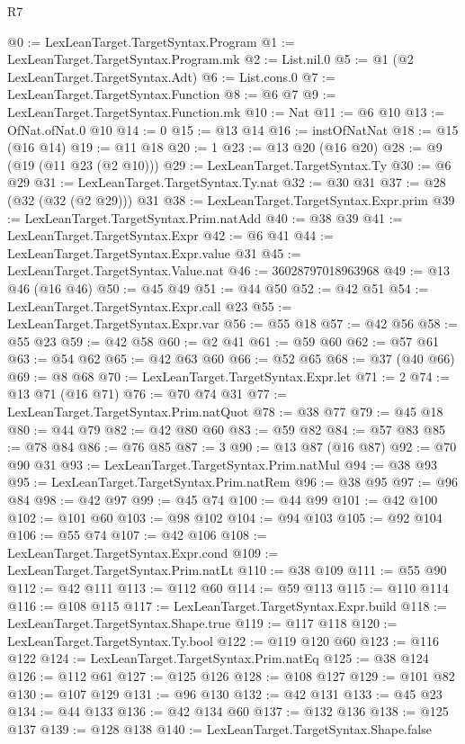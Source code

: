 \begin{lexlean}{R7}
\begin{coremodule}
@0 := LexLeanTarget.TargetSyntax.Program
@1 := LexLeanTarget.TargetSyntax.Program.mk
@2 := List.nil.{0}
@5 := @1 (@2 LexLeanTarget.TargetSyntax.Adt)
@6 := List.cons.{0}
@7 := LexLeanTarget.TargetSyntax.Function
@8 := @6 @7
@9 := LexLeanTarget.TargetSyntax.Function.mk
@10 := Nat
@11 := @6 @10
@13 := OfNat.ofNat.{0} @10
@14 := 0
@15 := @13 @14
@16 := instOfNatNat
@18 := @15 (@16 @14)
@19 := @11 @18
@20 := 1
@23 := @13 @20 (@16 @20)
@28 := @9 (@19 (@11 @23 (@2 @10)))
@29 := LexLeanTarget.TargetSyntax.Ty
@30 := @6 @29
@31 := LexLeanTarget.TargetSyntax.Ty.nat
@32 := @30 @31
@37 := @28 (@32 (@32 (@2 @29))) @31
@38 := LexLeanTarget.TargetSyntax.Expr.prim
@39 := LexLeanTarget.TargetSyntax.Prim.natAdd
@40 := @38 @39
@41 := LexLeanTarget.TargetSyntax.Expr
@42 := @6 @41
@44 := LexLeanTarget.TargetSyntax.Expr.value @31
@45 := LexLeanTarget.TargetSyntax.Value.nat
@46 := 36028797018963968
@49 := @13 @46 (@16 @46)
@50 := @45 @49
@51 := @44 @50
@52 := @42 @51
@54 := LexLeanTarget.TargetSyntax.Expr.call @23
@55 := LexLeanTarget.TargetSyntax.Expr.var
@56 := @55 @18
@57 := @42 @56
@58 := @55 @23
@59 := @42 @58
@60 := @2 @41
@61 := @59 @60
@62 := @57 @61
@63 := @54 @62
@65 := @42 @63 @60
@66 := @52 @65
@68 := @37 (@40 @66)
@69 := @8 @68
@70 := LexLeanTarget.TargetSyntax.Expr.let
@71 := 2
@74 := @13 @71 (@16 @71)
@76 := @70 @74 @31
@77 := LexLeanTarget.TargetSyntax.Prim.natQuot
@78 := @38 @77
@79 := @45 @18
@80 := @44 @79
@82 := @42 @80 @60
@83 := @59 @82
@84 := @57 @83
@85 := @78 @84
@86 := @76 @85
@87 := 3
@90 := @13 @87 (@16 @87)
@92 := @70 @90 @31
@93 := LexLeanTarget.TargetSyntax.Prim.natMul
@94 := @38 @93
@95 := LexLeanTarget.TargetSyntax.Prim.natRem
@96 := @38 @95
@97 := @96 @84
@98 := @42 @97
@99 := @45 @74
@100 := @44 @99
@101 := @42 @100
@102 := @101 @60
@103 := @98 @102
@104 := @94 @103
@105 := @92 @104
@106 := @55 @74
@107 := @42 @106
@108 := LexLeanTarget.TargetSyntax.Expr.cond
@109 := LexLeanTarget.TargetSyntax.Prim.natLt
@110 := @38 @109
@111 := @55 @90
@112 := @42 @111
@113 := @112 @60
@114 := @59 @113
@115 := @110 @114
@116 := @108 @115
@117 := LexLeanTarget.TargetSyntax.Expr.build
@118 := LexLeanTarget.TargetSyntax.Shape.true
@119 := @117 @118
@120 := LexLeanTarget.TargetSyntax.Ty.bool
@122 := @119 @120 @60
@123 := @116 @122
@124 := LexLeanTarget.TargetSyntax.Prim.natEq
@125 := @38 @124
@126 := @112 @61
@127 := @125 @126
@128 := @108 @127
@129 := @101 @82
@130 := @107 @129
@131 := @96 @130
@132 := @42 @131
@133 := @45 @23
@134 := @44 @133
@136 := @42 @134 @60
@137 := @132 @136
@138 := @125 @137
@139 := @128 @138
@140 := LexLeanTarget.TargetSyntax.Shape.false

\end{coremodule}
\end{lexlean}
